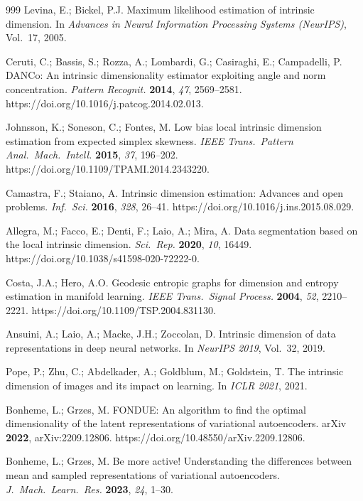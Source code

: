 \documentclass[make,article,submit,pdftex,moreauthors]{Definitions/mdpi}
\begin{document}
\begin{thebibliography}{999}
Levina, E.; Bickel, P.J.
Maximum likelihood estimation of intrinsic dimension.
In \textit{Advances in Neural Information Processing Systems (NeurIPS)},
Vol.~17, 2005.

Ceruti, C.; Bassis, S.; Rozza, A.; Lombardi, G.; Casiraghi, E.;
Campadelli, P.
DANCo: An intrinsic dimensionality estimator exploiting angle and norm
concentration.
\textit{Pattern Recognit.} \textbf{2014}, \textit{47}, 2569--2581.
https://doi.org/10.1016/j.patcog.2014.02.013.

Johnsson, K.; Soneson, C.; Fontes, M.
Low bias local intrinsic dimension estimation from expected simplex
skewness.
\textit{IEEE Trans.\ Pattern Anal.\ Mach.\ Intell.} \textbf{2015},
\textit{37}, 196--202. https://doi.org/10.1109/TPAMI.2014.2343220.

Camastra, F.; Staiano, A.
Intrinsic dimension estimation: Advances and open problems.
\textit{Inf.\ Sci.} \textbf{2016}, \textit{328}, 26--41.
https://doi.org/10.1016/j.ins.2015.08.029.

Allegra, M.; Facco, E.; Denti, F.; Laio, A.; Mira, A.
Data segmentation based on the local intrinsic dimension.
\textit{Sci.\ Rep.} \textbf{2020}, \textit{10}, 16449.
https://doi.org/10.1038/s41598-020-72222-0.

Costa, J.A.; Hero, A.O.
Geodesic entropic graphs for dimension and entropy estimation in manifold
learning.
\textit{IEEE Trans.\ Signal Process.} \textbf{2004}, \textit{52},
2210--2221. https://doi.org/10.1109/TSP.2004.831130.

Ansuini, A.; Laio, A.; Macke, J.H.; Zoccolan, D.
Intrinsic dimension of data representations in deep neural networks.
In \textit{NeurIPS 2019}, Vol.~32, 2019.

Pope, P.; Zhu, C.; Abdelkader, A.; Goldblum, M.; Goldstein, T.
The intrinsic dimension of images and its impact on learning.
In \textit{ICLR 2021}, 2021.

Bonheme, L.; Grzes, M.
FONDUE: An algorithm to find the optimal dimensionality of the latent
representations of variational autoencoders.
arXiv \textbf{2022}, arXiv:2209.12806.
https://doi.org/10.48550/arXiv.2209.12806.

Bonheme, L.; Grzes, M.
Be more active! Understanding the differences between mean and sampled
representations of variational autoencoders.
\textit{J.\ Mach.\ Learn.\ Res.} \textbf{2023}, \textit{24}, 1--30.


\end{thebibliography}
\end{document}
